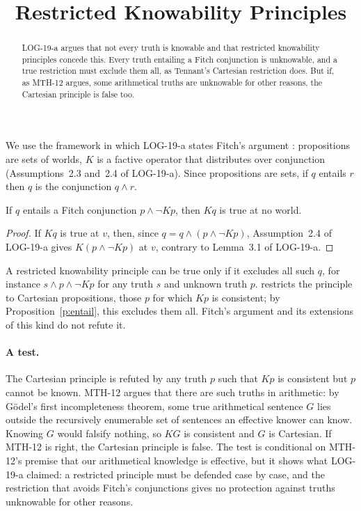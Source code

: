 \documentclass{situationist-preprint}
\title{Restricted Knowability Principles}
\begin{document}
\maketitle

\begin{abstract}
LOG-19-a argues that not every truth is knowable and that restricted knowability principles concede this. Every truth entailing a Fitch conjunction is unknowable, and a true restriction must exclude them all, as Tennant's Cartesian restriction does. But if, as MTH-12 argues, some arithmetical truths are unknowable for other reasons, the Cartesian principle is false too.
\end{abstract}

We use the framework in which LOG-19-a states Fitch's argument \citep{Fitch1963}: propositions are sets of worlds, $K$ is a factive operator that distributes over conjunction (Assumptions~2.3 and~2.4 of LOG-19-a). Since propositions are sets, if $q$ entails $r$ then $q$ is the conjunction $q \wedge r$.

\begin{proposition}\label{p:entail}
If $q$ entails a Fitch conjunction $p \wedge \neg Kp$, then $Kq$ is true at no world.
\end{proposition}

\begin{proof}
If $Kq$ is true at $v$, then, since $q = q \wedge (p \wedge \neg Kp)$, Assumption~2.4 of LOG-19-a gives $K(p \wedge \neg Kp)$ at $v$, contrary to Lemma~3.1 of LOG-19-a.
\end{proof}

A restricted knowability principle can be true only if it excludes all such $q$, for instance $s \wedge p \wedge \neg Kp$ for any truth $s$ and unknown truth $p$. \citet{Tennant1997} restricts the principle to Cartesian propositions, those $p$ for which $Kp$ is consistent; by Proposition~\ref{p:entail}, this excludes them all. Fitch's argument and its extensions of this kind do not refute it.

\paragraph{A test.} The Cartesian principle is refuted by any truth $p$ such that $Kp$ is consistent but $p$ cannot be known. MTH-12 argues that there are such truths in arithmetic: by Gödel's first incompleteness theorem, some true arithmetical sentence $G$ lies outside the recursively enumerable set of sentences an effective knower can know. Knowing $G$ would falsify nothing, so $KG$ is consistent and $G$ is Cartesian. If MTH-12 is right, the Cartesian principle is false. The test is conditional on MTH-12's premise that our arithmetical knowledge is effective, but it shows what LOG-19-a claimed: a restricted principle must be defended case by case, and the restriction that avoids Fitch's conjunctions gives no protection against truths unknowable for other reasons.
\end{document}

